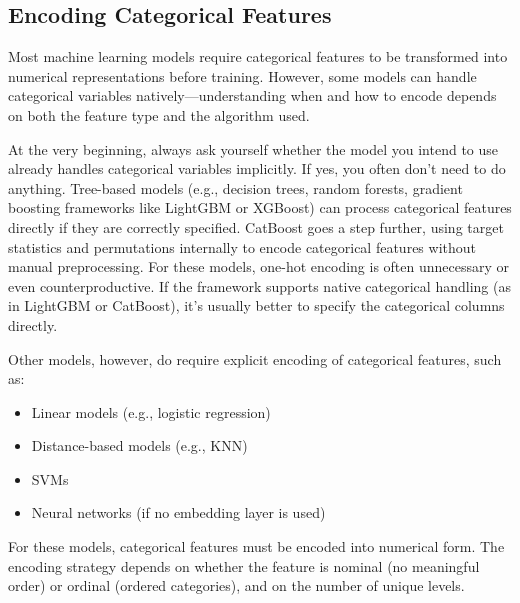 \documentclass[12pt,openany, draft]{book}
\begin{document}
\subsection{Encoding Categorical Features}

Most machine learning models require categorical features to be transformed into numerical representations before training. However, some models can handle categorical variables natively—understanding when and how to encode depends on both the feature type and the algorithm used. \newline

At the very beginning, always ask yourself whether the model you intend to use already handles categorical variables implicitly. If yes, you often don’t need to do anything. Tree-based models (e.g., decision trees, random forests, gradient boosting frameworks like LightGBM or XGBoost) can process categorical features directly if they are correctly specified. CatBoost goes a step further, using target statistics and permutations internally to encode categorical features without manual preprocessing. For these models, one-hot encoding is often unnecessary or even counterproductive. If the framework supports native categorical handling (as in LightGBM or CatBoost), it’s usually better to specify the categorical columns directly. \newline

Other models, however, do require explicit encoding of categorical features, such as:
\begin{itemize}
    \item Linear models (e.g., logistic regression)
    \item Distance-based models (e.g., KNN)
    \item SVMs
    \item Neural networks (if no embedding layer is used)
\end{itemize}

For these models, categorical features must be encoded into numerical form. The encoding strategy depends on whether the feature is nominal (no meaningful order) or ordinal (ordered categories), and on the number of unique levels. \newline
\end{document}
